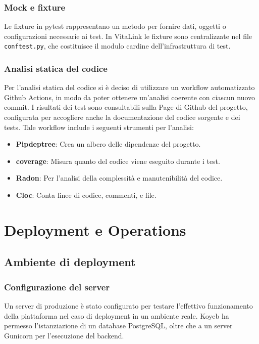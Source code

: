 \documentclass[12pt,a4paper,oneside]{report}
\begin{document}
\subsection{Mock e fixture}
Le fixture in pytest rappresentano un metodo per fornire dati, oggetti o configurazioni necessarie ai test.
In VitaLink le fixture sono centralizzate nel file \texttt{conftest.py}, che costituisce il modulo cardine dell'infrastruttura di test.
\subsection{Analisi statica del codice}
Per l'analisi statica del codice si è deciso di utilizzare un workflow automatizzato Github Actions, in modo da poter ottenere un'analisi coerente con ciascun nuovo commit.
I risultati dei test sono consultabili sulla Page di Github del progetto, configurata per accogliere anche la documentazione del codice sorgente e dei tests.
Tale workflow include i seguenti strumenti per l'analisi:
\begin{itemize}
    \item \textbf{Pipdeptree}: Crea un albero delle dipendenze del progetto.

    \item \textbf{coverage}: Misura quanto del codice viene eseguito durante i test.

    \item \textbf{Radon}: Per l’analisi della complessità e manutenibilità del codice.

    \item \textbf{Cloc}: Conta linee di codice, commenti, e file.
\end{itemize}

\chapter{Deployment e Operations}
\section{Ambiente di deployment}
\subsection{Configurazione del server}
Un server di produzione è stato configurato per testare l'effettivo funzionamento della piattaforma nel caso di deployment in un ambiente reale.
Koyeb \cite{koyeb} ha permesso l'istanziazione di un database PostgreSQL, oltre che a un server Gunicorn per l'esecuzione del backend.
\end{document}
